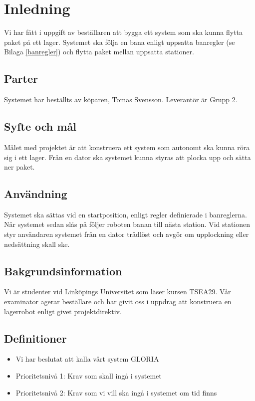 \section{Inledning}
Vi har fått i uppgift av beställaren att bygga ett system som ska kunna flytta paket på ett lager. Systemet ska följa en bana enligt uppsatta banregler (se Bilaga \ref{banregler}) och flytta paket mellan uppsatta stationer.

\subsection{Parter}
Systemet har beställts av köparen, Tomas Svensson. Leverantör är Grupp 2.

\subsection{Syfte och mål}
Målet med projektet är att konstruera ett system som autonomt ska kunna röra sig i ett lager. Från en dator ska systemet kunna styras att plocka upp och sätta ner paket.

\subsection{Användning}
Systemet ska sättas vid en startposition, enligt regler definierade i banreglerna. När systemet sedan slås på följer roboten banan till nästa station. Vid stationen styr användaren systemet från en dator trådlöst och avgör om upplockning eller nedsättning skall ske.

\subsection{Bakgrundsinformation}
Vi är studenter vid Linköpings Universitet som läser kursen TSEA29. Vår examinator agerar beställare och har givit oss i uppdrag att konstruera en lagerrobot enligt givet projektdirektiv.

\subsection{Definitioner}

\begin{itemize}
\item{Vi har beslutat att kalla vårt system GLORIA}
\item{Prioritetsnivå 1: Krav som skall ingå i systemet}
\item{Prioritetsnivå 2: Krav som vi vill ska ingå i systemet om tid finns}
\end{itemize}
